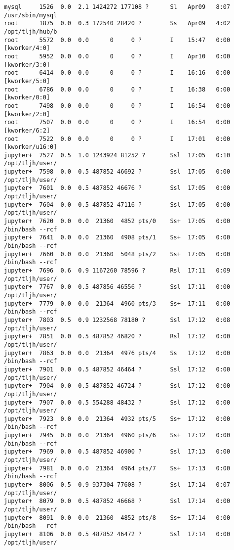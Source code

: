 \documentclass[11pt]{article}
\begin{document}
\begin{Verbatim}[commandchars=\\\{\}]
mysql     1526  0.0  2.1 1424272 177108 ?      Sl   Apr09   8:07 /usr/sbin/mysql
root      1875  0.0  0.3 172540 28420 ?        Ss   Apr09   4:02 /opt/tljh/hub/b
root      5572  0.0  0.0      0     0 ?        I    15:47   0:00 [kworker/4:0]
root      5952  0.0  0.0      0     0 ?        I    Apr10   0:00 [kworker/3:0]
root      6414  0.0  0.0      0     0 ?        I    16:16   0:00 [kworker/5:0]
root      6786  0.0  0.0      0     0 ?        I    16:38   0:00 [kworker/0:0]
root      7498  0.0  0.0      0     0 ?        I    16:54   0:00 [kworker/2:0]
root      7507  0.0  0.0      0     0 ?        I    16:54   0:00 [kworker/6:2]
root      7522  0.0  0.0      0     0 ?        I    17:01   0:00 [kworker/u16:0]
jupyter+  7527  0.5  1.0 1243924 81252 ?       Ssl  17:05   0:10 /opt/tljh/user/
jupyter+  7598  0.0  0.5 487852 46692 ?        Ssl  17:05   0:00 /opt/tljh/user/
jupyter+  7601  0.0  0.5 487852 46676 ?        Ssl  17:05   0:00 /opt/tljh/user/
jupyter+  7604  0.0  0.5 487852 47116 ?        Ssl  17:05   0:00 /opt/tljh/user/
jupyter+  7620  0.0  0.0  21360  4852 pts/0    Ss+  17:05   0:00 /bin/bash --rcf
jupyter+  7641  0.0  0.0  21360  4908 pts/1    Ss+  17:05   0:00 /bin/bash --rcf
jupyter+  7660  0.0  0.0  21360  5048 pts/2    Ss+  17:05   0:00 /bin/bash --rcf
jupyter+  7696  0.6  0.9 1167260 78596 ?       Rsl  17:11   0:09 /opt/tljh/user/
jupyter+  7767  0.0  0.5 487856 46556 ?        Ssl  17:11   0:00 /opt/tljh/user/
jupyter+  7779  0.0  0.0  21364  4960 pts/3    Ss+  17:11   0:00 /bin/bash --rcf
jupyter+  7803  0.5  0.9 1232568 78180 ?       Ssl  17:12   0:08 /opt/tljh/user/
jupyter+  7851  0.0  0.5 487852 46820 ?        Rsl  17:12   0:00 /opt/tljh/user/
jupyter+  7863  0.0  0.0  21364  4976 pts/4    Ss   17:12   0:00 /bin/bash --rcf
jupyter+  7901  0.0  0.5 487852 46464 ?        Ssl  17:12   0:00 /opt/tljh/user/
jupyter+  7904  0.0  0.5 487852 46724 ?        Ssl  17:12   0:00 /opt/tljh/user/
jupyter+  7907  0.0  0.5 554288 48432 ?        Ssl  17:12   0:00 /opt/tljh/user/
jupyter+  7923  0.0  0.0  21364  4932 pts/5    Ss+  17:12   0:00 /bin/bash --rcf
jupyter+  7945  0.0  0.0  21364  4960 pts/6    Ss+  17:12   0:00 /bin/bash --rcf
jupyter+  7969  0.0  0.5 487852 46900 ?        Ssl  17:13   0:00 /opt/tljh/user/
jupyter+  7981  0.0  0.0  21364  4964 pts/7    Ss+  17:13   0:00 /bin/bash --rcf
jupyter+  8006  0.5  0.9 937304 77608 ?        Ssl  17:14   0:07 /opt/tljh/user/
jupyter+  8079  0.0  0.5 487852 46668 ?        Ssl  17:14   0:00 /opt/tljh/user/
jupyter+  8091  0.0  0.0  21360  4852 pts/8    Ss+  17:14   0:00 /bin/bash --rcf
jupyter+  8106  0.0  0.5 487852 46472 ?        Ssl  17:14   0:00 /opt/tljh/user/

\end{Verbatim}
\end{document}
